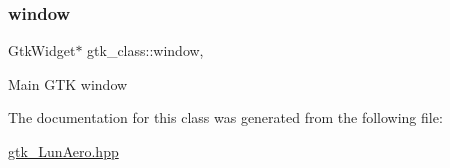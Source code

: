 \subsubsection{\texorpdfstring{window}{window}}
{\footnotesize\ttfamily Gtk\+Widget$\ast$ gtk\+\_\+class\+::window\hspace{0.3cm}{\ttfamily [inline]}, {\ttfamily [static]}}

Main G\+TK window 

The documentation for this class was generated from the following file\+:\begin{DoxyCompactItemize}
\item 
\hyperlink{gtk__LunAero_8hpp}{gtk\+\_\+\+Lun\+Aero.\+hpp}\end{DoxyCompactItemize}
